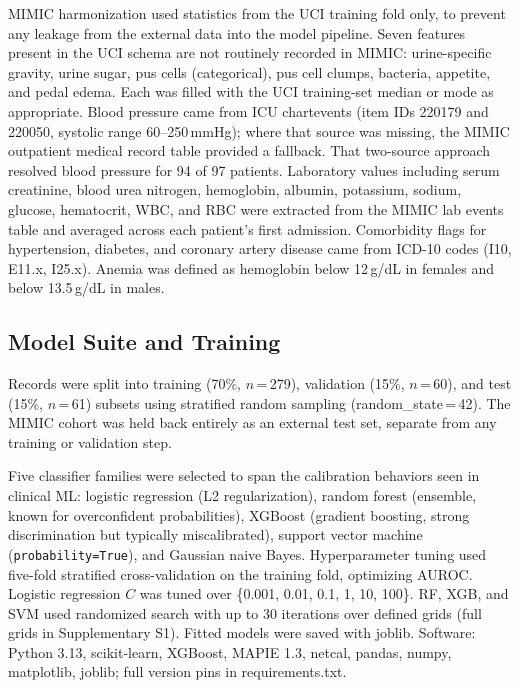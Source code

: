 MIMIC harmonization used statistics from the UCI training fold only, to prevent any leakage from the external data into the model pipeline. Seven features present in the UCI schema are not routinely recorded in MIMIC: urine-specific gravity, urine sugar, pus cells (categorical), pus cell clumps, bacteria, appetite, and pedal edema. Each was filled with the UCI training-set median or mode as appropriate. Blood pressure came from ICU chartevents (item IDs 220179 and 220050, systolic range 60--250\,mmHg); where that source was missing, the MIMIC outpatient medical record table provided a fallback. That two-source approach resolved blood pressure for 94 of 97 patients. Laboratory values including serum creatinine, blood urea nitrogen, hemoglobin, albumin, potassium, sodium, glucose, hematocrit, WBC, and RBC were extracted from the MIMIC lab events table and averaged across each patient's first admission. Comorbidity flags for hypertension, diabetes, and coronary artery disease came from ICD-10 codes (I10, E11.x, I25.x). Anemia was defined as hemoglobin below 12\,g/dL in females and below 13.5\,g/dL in males.

\subsection{Model Suite and Training}

Records were split into training (70\%, $n$\,=\,279), validation (15\%, $n$\,=\,60), and test (15\%, $n$\,=\,61) subsets using stratified random sampling (random\_state\,=\,42). The MIMIC cohort was held back entirely as an external test set, separate from any training or validation step.

Five classifier families were selected to span the calibration behaviors seen in clinical ML: logistic regression (L2 regularization), random forest (ensemble, known for overconfident probabilities), XGBoost (gradient boosting, strong discrimination but typically miscalibrated), support vector machine (\texttt{probability=True}), and Gaussian naive Bayes. Hyperparameter tuning used five-fold stratified cross-validation on the training fold, optimizing AUROC. Logistic regression $C$ was tuned over \{0.001, 0.01, 0.1, 1, 10, 100\}. RF, XGB, and SVM used randomized search with up to 30 iterations over defined grids (full grids in Supplementary S1). Fitted models were saved with joblib. Software: Python 3.13, scikit-learn, XGBoost, MAPIE 1.3, netcal, pandas, numpy, matplotlib, joblib; full version pins in requirements.txt.

